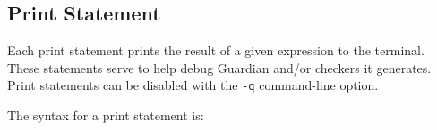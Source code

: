
\subsection{Print Statement}
{
	Each print statement prints the result of a given expression to
	the terminal. These statements serve to help debug
	Guardian and/or checkers it
	generates.
	Print statements can be disabled with the \texttt{-q} command-line option.
	
	The syntax for a print statement is:
	\begin{lstlisting}[texcl = true, language = MAIA]
%print: <expression>;
	\end{lstlisting}
}
